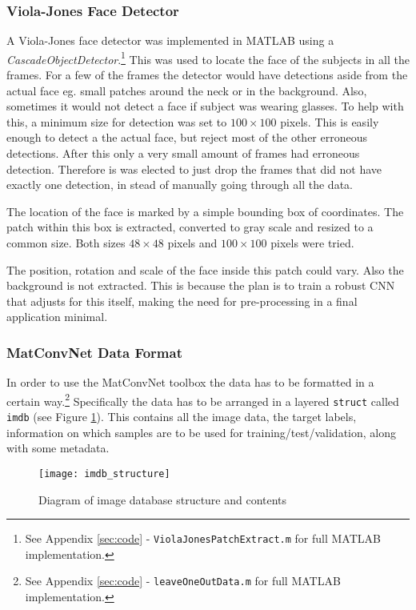 \documentclass[Main]{subfiles}
\begin{document}
		\subsubsection{Viola-Jones Face Detector} %
			\label{ssub:viola_jones_face_detector}
			A Viola-Jones face detector was implemented in MATLAB using a \emph{CascadeObjectDetector}.\footnote{See Appendix \ref{sec:code} - \texttt{ViolaJonesPatchExtract.m} for full MATLAB implementation.}
			This was used to locate the face of the subjects in all the frames.
			For a few of the frames the detector would have detections aside from the actual face eg. small patches around the neck or in the background.
			Also, sometimes it would not detect a face if subject was wearing glasses.
			To help with this, a minimum size for detection was set to $100\times100$ pixels.
			This is easily enough to detect a the actual face, but reject most of the other erroneous detections.
			After this only a very small amount of frames had erroneous detection.
			Therefore is was elected to just drop the frames that did not have exactly one detection, in stead of manually going through all the data.

			The location of the face is marked by a simple bounding box of coordinates.
			The patch within this box is extracted, converted to gray scale and resized to a common size.
			Both sizes $48\times48$ pixels and $100\times100$ pixels were tried.

			The position, rotation and scale of the face inside this patch could vary.
			Also the background is not extracted.
			This is because the plan is to train a robust CNN that adjusts for this itself, making the need for pre-processing in a final application minimal.


		\subsubsection{MatConvNet Data Format} %
			\label{ssub:matconvnet_data_format}
			In order to use the MatConvNet toolbox the data has to be formatted in a certain way.\footnote{See Appendix \ref{sec:code} - \texttt{leaveOneOutData.m} for full MATLAB implementation.}
			Specifically the data has to be arranged in a layered \texttt{struct} called \texttt{imdb} (see Figure \ref{fig:imdb_struct}).
			This contains all the image data, the target labels, information on which samples are to be used for training/test/validation, along with some metadata.
			\begin{figure}[th]
				\begin{center}
					\texttt{[image: imdb\_structure]}
				\end{center}
				\caption{Diagram of image database structure and contents}
				\label{fig:imdb_struct}
			\end{figure}
			
\end{document}
